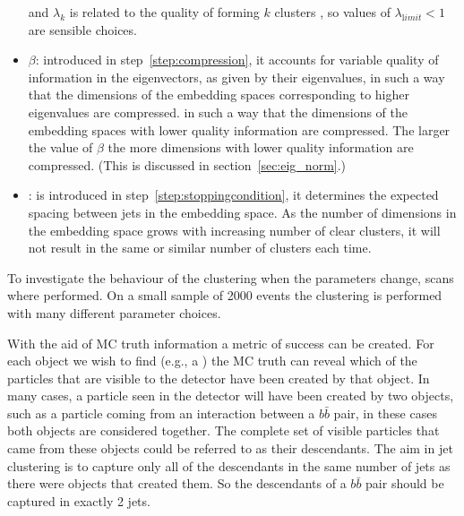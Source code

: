 \begin{itemize}
           and \(\lambda_k\) is related to the quality of forming \(k\)
           clusters \cite{JamesRLee:2014_unfound736},
           so values of $\lambda_{\mathrm limit} < 1$ are sensible choices.
       \item  \(\beta\): introduced in step~\ref{step:compression}, it 
          accounts for variable quality of information in the eigenvectors, as given by their eigenvalues,
        in such a way that the dimensions of the embedding spaces 
        corresponding to higher eigenvalues are compressed.
        in such a way that the dimensions of the embedding spaces with lower
        quality information are compressed.
        The larger the value of \(\beta\) the more dimensions with
        lower quality information are compressed.
        (This is discussed in section~\ref{sec:eig_norm}.)
    \item \stoppingdeltar{}: is introduced in step~\ref{step:stoppingcondition}, it
         determines the expected spacing between jets in the embedding space.
         As the number of dimensions in the embedding space grows with increasing 
         number of clear clusters, it will not result in the same or
         similar number of clusters each time.

\end{itemize}


To investigate the behaviour of the clustering when the parameters change, scans where performed.
On a small sample of 2000 events  the clustering is performed with many different parameter choices.

With the aid of MC truth information a metric of success can be created.
For each object we wish to find (e.g., a ) 
the MC truth can reveal which of the particles that are visible to the detector have
been created by that object.
In many cases, a particle seen in the detector will have been created by two objects,
such as a particle coming from an interaction between a \(b\bar{b}\) pair,
in these cases both objects are considered together.
The complete set of visible particles that came from these objects could be referred to as their descendants.
The aim in jet clustering is to capture only all of the descendants in the same number of jets as there were objects that created them.
So the descendants of a \(b\bar{b}\) pair should be captured in exactly 2 jets.

